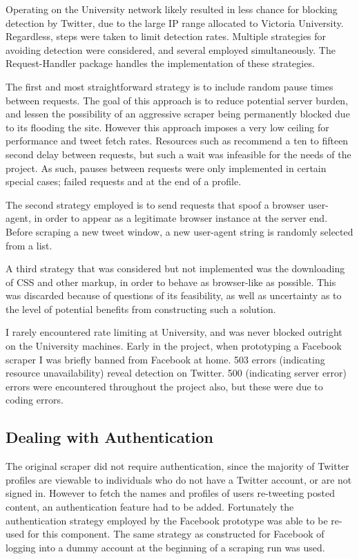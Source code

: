Operating on the University network likely resulted in less chance for blocking detection by Twitter, due to the large IP range allocated to Victoria University. Regardless, steps were taken to limit detection rates. Multiple strategies for avoiding detection were considered, and several employed simultaneously. The Request-Handler package handles the implementation of these strategies.

The first and most straightforward strategy is to include random pause times between requests. The goal of this approach is to reduce potential server burden, and lessen the possibility of an aggressive scraper being permanently blocked due to its flooding the site. However this approach imposes a very low ceiling for performance and tweet fetch rates. Resources such as \cite{} recommend a ten to fifteen second delay between requests, but such a wait was infeasible for the needs of the project. As such, pauses between requests were only implemented in certain special cases; failed requests and at the end of a profile. 

The second strategy employed is to send requests that spoof a browser user-agent, in order to appear as a legitimate browser instance at the server end. Before scraping a new tweet window, a new user-agent string is randomly selected from a list. 

A third strategy that was considered but not implemented was the downloading of CSS and other markup, in order to behave as browser-like as possible. This was discarded because of questions of its feasibility, as well as uncertainty as to the level of potential benefits from constructing such a solution. 

I rarely encountered rate limiting at University, and was never blocked outright on the University machines. Early in the project, when prototyping a Facebook scraper I was briefly banned from Facebook at home. 503 errors (indicating resource unavailability) reveal detection on Twitter. 500 (indicating server error) errors were encountered throughout the project also, but these were due to coding errors. 

\subsection{Dealing with Authentication}

The original scraper did not require authentication, since the majority of Twitter profiles are viewable to individuals who do not have a Twitter account, or are not signed in. However to fetch the names and profiles of users re-tweeting posted content, an authentication feature had to be added. Fortunately the authentication strategy employed by the Facebook prototype was able to be re-used for this component. The same strategy as constructed for Facebook of logging into a dummy account at the beginning of a scraping run was used.  

